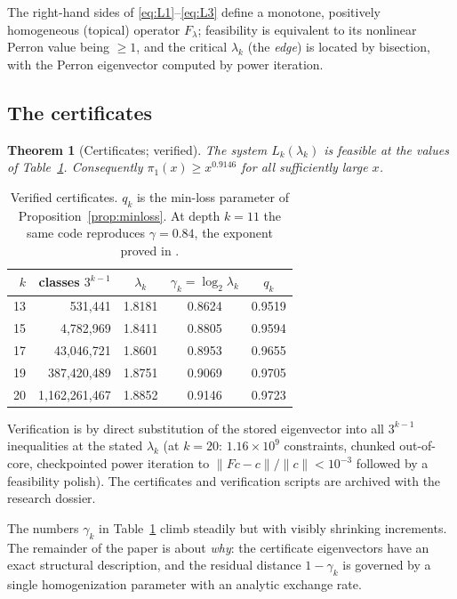 \documentclass[11pt]{article}
\newtheorem{theorem}{Theorem}
\theoremstyle{definition}
\theoremstyle{remark}
\newcommand{\lam}{\lambda}
\newcommand{\gam}{\gamma}
\begin{document}
The right-hand sides of \eqref{eq:L1}--\eqref{eq:L3} define a monotone,
positively homogeneous (topical) operator $F_\lam$; feasibility is equivalent
to its nonlinear Perron value being $\geq 1$, and the critical $\lam_k$ (the
\emph{edge}) is located by bisection, with the Perron eigenvector computed by
power iteration.

\subsection{The certificates}

\begin{theorem}[Certificates; verified]\label{thm:certs}
The system $L_k(\lam_k)$ is feasible at the values of Table~\ref{tab:certs}.
Consequently $\pi_1(x) \geq x^{0.9146}$ for all sufficiently large $x$.
\end{theorem}

\begin{table}[ht]
\centering
\begin{tabular}{r r c c c}
\hline
$k$ & classes $3^{k-1}$ & $\lam_k$ & $\gam_k = \log_2 \lam_k$ & $q_k$ \\
\hline
13 & 531{,}441        & 1.8181 & 0.8624 & 0.9519 \\
15 & 4{,}782{,}969    & 1.8411 & 0.8805 & 0.9594 \\
17 & 43{,}046{,}721   & 1.8601 & 0.8953 & 0.9655 \\
19 & 387{,}420{,}489  & 1.8751 & 0.9069 & 0.9705 \\
20 & 1{,}162{,}261{,}467 & 1.8852 & 0.9146 & 0.9723 \\
\hline
\end{tabular}
\caption{Verified certificates. $q_k$ is the min-loss parameter of
Proposition~\ref{prop:minloss}. At depth $k = 11$ the same code reproduces
$\gam = 0.84$, the exponent proved in \cite{KL03}.}
\label{tab:certs}
\end{table}

Verification is by direct substitution of the stored eigenvector into all
$3^{k-1}$ inequalities at the stated $\lam_k$ (at $k = 20$: $1.16 \times 10^9$
constraints, chunked out-of-core, checkpointed power iteration to
$\|F c - c\|/\|c\| < 10^{-3}$ followed by a feasibility polish). The
certificates and verification scripts are archived with the research dossier.

The numbers $\gam_k$ in Table~\ref{tab:certs} climb steadily but with visibly
shrinking increments. The remainder of the paper is about \emph{why}: the
certificate eigenvectors have an exact structural description, and the residual
distance $1 - \gam_k$ is governed by a single homogenization parameter with an
analytic exchange rate.
\end{document}
